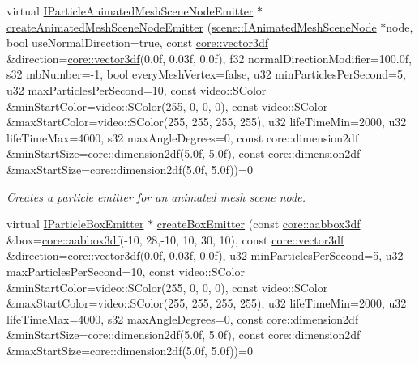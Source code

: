 \begin{DoxyCompactItemize}
virtual \hyperlink{classirr_1_1scene_1_1IParticleAnimatedMeshSceneNodeEmitter}{I\+Particle\+Animated\+Mesh\+Scene\+Node\+Emitter} $\ast$ \hyperlink{classirr_1_1scene_1_1IParticleSystemSceneNode_a1459245186d570f81f6c7ff78ddd38db}{create\+Animated\+Mesh\+Scene\+Node\+Emitter} (\hyperlink{classirr_1_1scene_1_1IAnimatedMeshSceneNode}{scene\+::\+I\+Animated\+Mesh\+Scene\+Node} $\ast$node, bool use\+Normal\+Direction=true, const \hyperlink{namespaceirr_1_1core_ae6e2b2a6c552833ebbd5b7463d03586b}{core\+::vector3df} \&direction=\hyperlink{namespaceirr_1_1core_ae6e2b2a6c552833ebbd5b7463d03586b}{core\+::vector3df}(0.\+0f, 0.\+03f, 0.\+0f), f32 normal\+Direction\+Modifier=100.\+0f, s32 mb\+Number=-\/1, bool every\+Mesh\+Vertex=false, u32 min\+Particles\+Per\+Second=5, u32 max\+Particles\+Per\+Second=10, const video\+::\+S\+Color \&min\+Start\+Color=video\+::\+S\+Color(255, 0, 0, 0), const video\+::\+S\+Color \&max\+Start\+Color=video\+::\+S\+Color(255, 255, 255, 255), u32 life\+Time\+Min=2000, u32 life\+Time\+Max=4000, s32 max\+Angle\+Degrees=0, const core\+::dimension2df \&min\+Start\+Size=core\+::dimension2df(5.\+0f, 5.\+0f), const core\+::dimension2df \&max\+Start\+Size=core\+::dimension2df(5.\+0f, 5.\+0f))=0
\begin{DoxyCompactList}\small\item\em Creates a particle emitter for an animated mesh scene node. \end{DoxyCompactList}\item 
virtual \hyperlink{classirr_1_1scene_1_1IParticleBoxEmitter}{I\+Particle\+Box\+Emitter} $\ast$ \hyperlink{classirr_1_1scene_1_1IParticleSystemSceneNode_ae5f92fb41680b5da357c42cbb44e1675}{create\+Box\+Emitter} (const \hyperlink{namespaceirr_1_1core_a60f4b4c744aba55f10530d503c6ecb04}{core\+::aabbox3df} \&box=\hyperlink{namespaceirr_1_1core_a60f4b4c744aba55f10530d503c6ecb04}{core\+::aabbox3df}(-\/10, 28,-\/10, 10, 30, 10), const \hyperlink{namespaceirr_1_1core_ae6e2b2a6c552833ebbd5b7463d03586b}{core\+::vector3df} \&direction=\hyperlink{namespaceirr_1_1core_ae6e2b2a6c552833ebbd5b7463d03586b}{core\+::vector3df}(0.\+0f, 0.\+03f, 0.\+0f), u32 min\+Particles\+Per\+Second=5, u32 max\+Particles\+Per\+Second=10, const video\+::\+S\+Color \&min\+Start\+Color=video\+::\+S\+Color(255, 0, 0, 0), const video\+::\+S\+Color \&max\+Start\+Color=video\+::\+S\+Color(255, 255, 255, 255), u32 life\+Time\+Min=2000, u32 life\+Time\+Max=4000, s32 max\+Angle\+Degrees=0, const core\+::dimension2df \&min\+Start\+Size=core\+::dimension2df(5.\+0f, 5.\+0f), const core\+::dimension2df \&max\+Start\+Size=core\+::dimension2df(5.\+0f, 5.\+0f))=0

\end{DoxyCompactItemize}
